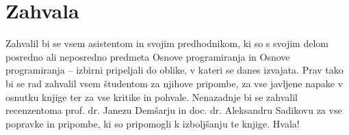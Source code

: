 \chapter*{Zahvala}

Zahvalil bi se vsem asistentom in svojim predhodnikom, ki so s svojim delom posredno ali neposredno predmeta Osnove programiranja in Osnove programiranja -- izbirni pripeljali do oblike, v kateri se danes izvajata. Prav tako bi se rad zahvalil vsem študentom za njihove pripombe, za vse javljene napake v osnutku knjige ter za vse kritike in pohvale. Nenazadnje bi se zahvalil recenzentoma prof. dr. Janezu Demšarju in doc. dr. Aleksandru Sadikovu za vse popravke in pripombe, ki so pripomogli k izboljšanju te knjige. Hvala!


